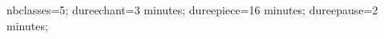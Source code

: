 \documentclass[exercice]{thedocument}%
\begin{document}
%
    \>nbclasses=5;%
    \>dureechant=3 minutes;%
    \>dureepiece=16 minutes;%
    \>dureepause=2 minutes;%
\end{document}
